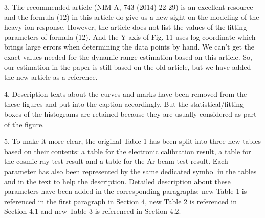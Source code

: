 \documentclass[]{article}
\begin{document}
3. The recommended article (NIM-A, 743 (2014) 22-29) is an excellent resource and the formula (12) in this article do give us a new sight on the modeling of the heavy ion response. However, the article does not list the values of the fitting parameters of formula (12). And the Y-axis of Fig. 11 uses log coordinate which brings large errors when determining the data points by hand. We can't get the exact values needed for the dynamic range estimation based on this article. So, our estimation in the paper is still based on the old article, but we have added the new article as a reference.

4. Description texts about the curves and marks have been removed from the these figures and put into the caption accordingly. But the statistical/fitting boxes of the histograms are retained because they are usually considered as part of the figure.

5. To make it more clear, the original Table 1 has been split into three new tables based on their contents: a table for the electronic calibration result, a table for the cosmic ray test result and a table for the Ar beam test result. Each parameter has also been represented by the same dedicated symbol in the tables and in the text to help the description. Detailed description about these parameters have been added in the corresponding paragraphs: new Table 1 is referenced in the first paragraph in Section 4, new Table 2 is referenced in Section 4.1 and new Table 3 is referenced in Section 4.2. 
\end{document}
